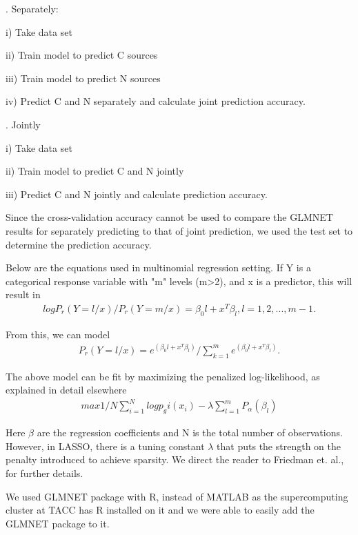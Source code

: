 \documentclass[12pt]{article}
\begin{document}
\bigskip
{}. Separately:
\noindent

i) Take data set
\noindent

ii) Train model to predict C sources
\noindent

iii) Train model to predict N sources
\noindent

iv) Predict C and N separately and calculate joint prediction accuracy.

\bigskip
{}. Jointly
\noindent

i) Take data set
\noindent

ii) Train model to predict C and N jointly
\noindent

iii) Predict C and N jointly and calculate prediction accuracy.

\bigskip
\noindent
Since the cross-validation accuracy cannot be used to compare the GLMNET results for separately predicting to that of joint prediction, we used the test set to determine the prediction accuracy.

\bigskip
\noindent
Below are the equations used in multinomial regression setting. If Y is a categorical response variable with "m" levels (m>2), and x is a predictor, this will result in
\begin{align}
log P_r(Y=l/x)/P_r(Y=m/x) = \beta_0l+x^T\beta_l, l=1,2,...,m-1.
\end{align}

From this, we can model
\begin{align}
P_r(Y=l/x) = e^( \beta_0l+x^T\beta_l)/\sum\limits_{k=1}^m e^( \beta_0l+x^T\beta_l).
\end{align}

The above model can be fit by maximizing the penalized log-likelihood, as explained in detail elsewhere \cite{Friedmanetal2008}
\begin{align}
{max} 1/N \sum\limits_{i=1}^N log p_gi(x_i) - \lambda\sum\limits_{l=1}^m P_\alpha(\beta_l)
\end{align}


\noindent
Here $\beta$ are the regression coefficients and N is the total number of observations. However, in LASSO, there is a tuning constant $\lambda$ that puts the strength on the penalty introduced to achieve sparsity. We direct the reader to Friedman et. al., \cite{Friedmanetal2008} for further details.

\bigskip
\noindent
We used GLMNET package with R, instead of MATLAB as the supercomputing cluster at TACC has R installed on it and we were able to easily add the GLMNET package to it.
\end{document}

